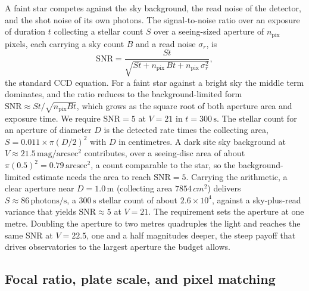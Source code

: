 A faint star competes against the sky background, the read noise of the
detector, and the shot noise of its own photons. The signal-to-noise ratio over
an exposure of duration $t$ collecting a stellar count $S$ over a seeing-sized
aperture of $n_{\text{pix}}$ pixels, each carrying a sky count $B$ and a read
noise $\sigma_{r}$, is
\[
\text{SNR} = \frac{S t}{\sqrt{S t + n_{\text{pix}}\,B t
+ n_{\text{pix}}\,\sigma_{r}^{2}}},
\]
the standard CCD equation. For a faint star against a bright sky the middle
term dominates, and the ratio reduces to the background-limited form
$\text{SNR} \approx S t/\sqrt{n_{\text{pix}} B t}$, which grows as the square
root of both aperture area and exposure time. We require $\text{SNR} = 5$ at
$V = 21$ in $t = 300\,\si{\second}$. The stellar count for an aperture of
diameter $D$ is the detected rate times the collecting area,
$S = 0.011\times \pi (D/2)^{2}$ with $D$ in centimetres. A dark site sky
background at $V \approx 21.5\,\text{mag}/\text{arcsec}^{2}$ contributes, over a
seeing-disc area of about $\pi(0.5)^{2} = 0.79\,\text{arcsec}^{2}$, a count
comparable to the star, so the background-limited estimate needs the area to
reach $\text{SNR} = 5$. Carrying the arithmetic, a clear aperture near
$D = 1.0\,\si{\meter}$ (collecting area $7854\,\si{cm^{2}}$) delivers
$S \approx 86\,\text{photons}/\text{s}$, a $300\,\si{\second}$ stellar count of
about
$2.6\times 10^{4}$, against a sky-plus-read variance that yields
$\text{SNR}\approx 5$ at $V = 21$. The requirement sets the aperture at one
metre. Doubling the aperture to two metres quadruples the light and reaches the
same SNR at $V = 22.5$, one and a half magnitudes deeper, the steep payoff that
drives observatories to the largest aperture the budget allows.

\subsection{Focal ratio, plate scale, and pixel matching}

